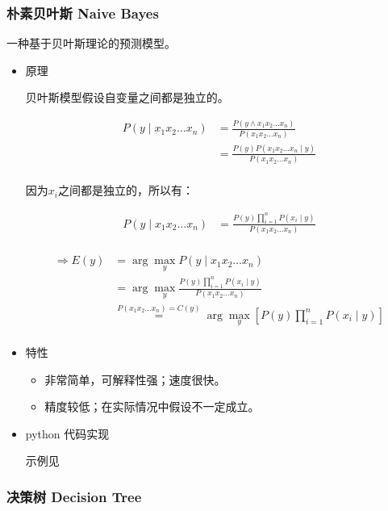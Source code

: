 \documentclass{article}
\begin{document}
\subsubsection{朴素贝叶斯 Naive Bayes}

一种基于贝叶斯理论的预测模型。

\begin{itemize}

\item{原理}

贝叶斯模型假设自变量之间都是独立的。

\[\begin{split}
P(y \mid x_1 x_2 \ldots x_n) & = \frac{P(y \land x_1 x_2 \ldots x_n)}{P(x_1 x_2 \ldots x_n)}\\
& = \frac{P(y)P(x_1 x_2 \ldots x_n \mid y)}{P(x_1 x_2 \ldots x_n)}\\
\end{split}\]

因为$x_i$之间都是独立的，所以有：

\[\begin{split}
P(y \mid x_1 x_2 \ldots x_n) & = \frac{P(y)\prod_{i=1}^{n}P(x_i \mid y)}{P(x_1 x_2 \ldots x_n)}\\
\end{split}\]

\[\begin{split}
    \Rightarrow E(y) & = \arg \max_y P(y \mid x_1 x_2 \ldots x_n) \\
    & = \arg \max_y \frac{P(y)\prod_{i=1}^{n}P(x_i \mid y)}{P(x_1 x_2 \ldots x_n)} \\
    & \stackrel{P(x_1 x_2 \ldots x_n) = C(y)}{=} \arg \max_y \left[P(y)\prod_{i=1}^{n}P(x_i \mid y)\right] \\
\end{split}\]

\item{特性}

\begin{itemize}
    \item 非常简单，可解释性强；速度很快。
    \item 精度较低；在实际情况中假设不一定成立。
\end{itemize}

\item{python 代码实现}

示例见

\end{itemize}

\subsubsection{决策树 Decision Tree}
\end{document}
